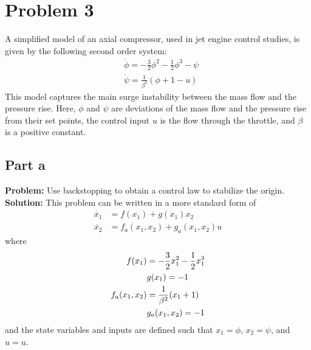 \documentclass[letter]{article}
\begin{document}
\newpage
\section{Problem 3}
A simplified model of an axial compressor, used in jet engine control studies, is given by the following second order system:
\begin{equation}
	\begin{aligned}
		&\dot{\phi} = - \frac{3}{2} \phi^2 - \frac{1}{2} \phi^3 - \psi\\
		&\dot{\psi} = \frac{1}{\beta^2}(\phi + 1 - u)
	\end{aligned}
\end{equation}
This model captures the main surge instability between the mass flow and the pressure rise. Here, $\phi$ and $\psi$ are deviations of the mass flow and the pressure rise from their set points, the control input $u$ is the flow through the throttle, and $\beta$ is a positive constant.

\subsection{Part a}
\textbf{Problem:}
Use backstopping to obtain a control law to stabilize the origin.\\

\noindent
\textbf{Solution:}
This problem can be written in a more standard form of
\begin{align}\label{eq:backstep_original}
	\dot{x_1} &= f(x_1) + g(x_1) x_2\nonumber\\
	\dot{x_2} &= f_a(x_1,x_2) + g_a(x_1,x_2) u
\end{align}
where
\begin{align}
	f(x_1) &= -\frac{3}{2} x_1^2 - \frac{1}{2} x_1^3\\
	&g(x_1) = -1\nonumber \\
	f_a(x_1,x_2) &= \frac{1}{\beta^2} \qty(x_1 + 1)\\
	&g_a(x_1,x_2) = -1\nonumber
\end{align}
and the state variables and inputs are defined such that $x_1 = \phi$, $x_2 = \psi$, and $u = u$.
\end{document}
